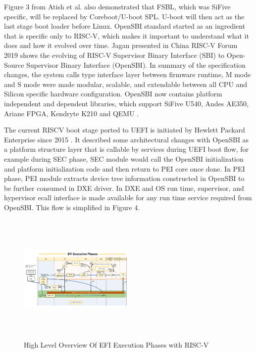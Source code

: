 \documentclass[a4paper,fleqn]{cas-dc}
\begin{document}
Figure 3 from Atish et al. also demonstrated that FSBL, which was SiFive specific, will be replaced by Coreboot/U-boot SPL. U-boot will then act as the last stage boot loader before Linux. OpenSBI standard started as an ingredient that is specific only to RISC-V, which makes it important to understand what it does and how it evolved over time. Jagan presented in China RISC-V Forum 2019 shows the evolving of RISC-V Supervisor Binary Interface (SBI) to Open-Source Supervisor Binary Interface (OpenSBI). In summary of the specification changes, the system calls type interface layer between firmware runtime, M mode and S mode were made modular, scalable, and extendable between all CPU and Silicon specific hardware configuration. OpenSBI now contains platform independent and dependent libraries, which support SiFive U540, Andes AE350, Ariane FPGA, Kendryte K210 and QEMU \cite{R51:1}.

The current RISCV boot stage ported to UEFI is initiated by Hewlett Packard Enterprise since 2015  \cite{R51:2}. It described some architectural changes with OpenSBI as a platform structure layer that is callable by services during UEFI boot flow, for example during SEC phase, SEC module would call the OpenSBI initialization and platform initialization code and then return to PEI core once done. In PEI phase, PEI module extracts device tree information constructed in OpenSBI to be further consumed in DXE driver. In DXE and OS run time, supervisor, and hypervisor ecall interface is made available for any run time service required from OpenSBI. This flow is simplified in Figure 4.

\begin{figure}[hbt!]
	\centering
	\includegraphics[width=0.5\textwidth,height=2.5in]{figs/HighLevelOverviewOfEfi.JPG}
	\caption{High Level Overview Of EFI Execution Phases with RISC-V}
\end{figure}
\end{document}
